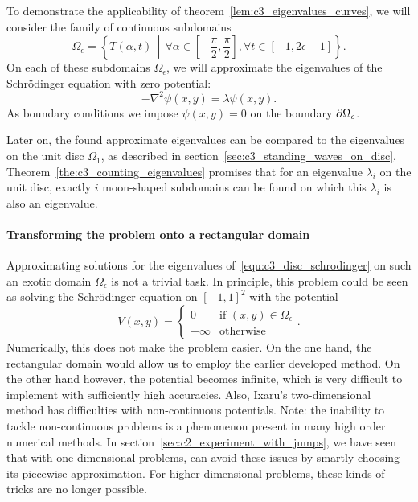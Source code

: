 To demonstrate the applicability of theorem~\ref{lem:c3_eigenvalues_curves}, we will consider the family of continuous subdomains
$$
  \Omega_\epsilon = \left\{T(\alpha, t) \,\middle|\, \forall \alpha \in \left[-\frac{\pi}{2}, \frac{\pi}{2}\right], \forall t \in [-1, 2\epsilon - 1]  \right\}\text{.}
$$
On each of these subdomains $\Omega_\epsilon$, we will approximate the eigenvalues of the Schrödinger equation with zero potential:
\begin{equation}\label{equ:c3_disc_schrodinger}
  -\nabla^2 \psi(x, y) = \lambda \psi(x, y)\text{.}
\end{equation}
As boundary conditions we impose $\psi(x, y) = 0$ on the boundary $\partial\Omega_\epsilon$.

Later on, the found approximate eigenvalues can be compared to the eigenvalues on the unit disc $\Omega_1$, as described in section~\ref{sec:c3_standing_waves_on_disc}. Theorem~\ref{the:c3_counting_eigenvalues} promises that for an eigenvalue $\lambda_i$ on the unit disc, exactly $i$ moon-shaped subdomains can be found on which this $\lambda_i$ is also an eigenvalue.

\paragraph{Transforming the problem onto a rectangular domain}

Approximating solutions for the eigenvalues of~\eqref{equ:c3_disc_schrodinger} on such an exotic domain $\Omega_\epsilon$ is not a trivial task. In principle, this problem could be seen as solving the Schrödinger equation on $[-1,1]^2$ with the potential
$$
  V(x, y) = \begin{cases}
    0       & \text{if $(x, y)\in \Omega_\epsilon$} \\
    +\infty & \text{otherwise}
  \end{cases} {}\text{.}
$$
Numerically, this does not make the problem easier. On the one hand, the rectangular domain would allow us to employ the earlier developed method. On the other hand however, the potential becomes infinite, which is very difficult to implement with sufficiently high accuracies. Also, Ixaru's two-dimensional method has difficulties with non-continuous potentials. Note: the inability to tackle non-continuous problems is a phenomenon present in many high order numerical methods. In section~\ref{sec:c2_experiment_with_jumps}, we have seen that with one-dimensional problems, \matslise{} can avoid these issues by smartly choosing its piecewise approximation. For higher dimensional problems, these kinds of tricks are no longer possible.

